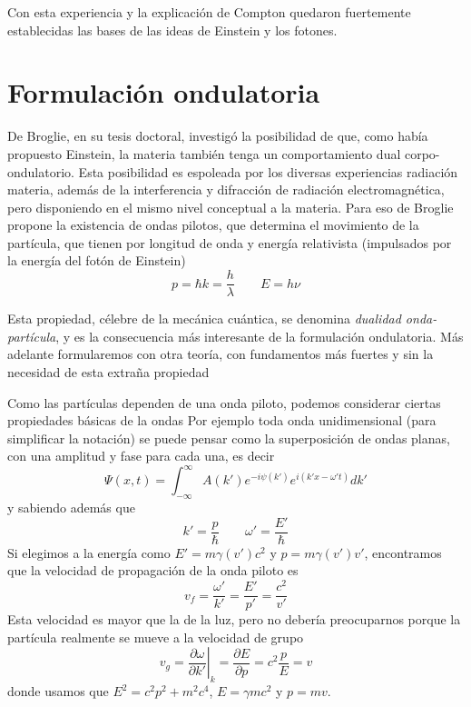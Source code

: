 Con esta experiencia y la explicación de Compton quedaron fuertemente establecidas las bases de las ideas de Einstein y los fotones.

\section{Formulación ondulatoria}

De Broglie, en su tesis doctoral, investigó la posibilidad de que, como había propuesto Einstein, la materia también tenga un comportamiento dual corpo-ondulatorio.
Esta posibilidad es espoleada por los diversas experiencias radiación materia, además de la interferencia y difracción de radiación electromagnética, pero disponiendo en el mismo nivel conceptual a la materia.
Para eso de Broglie propone la existencia de ondas pilotos, que determina el movimiento de la partícula, que tienen por longitud de onda y energía relativista (impulsados por la energía del fotón de Einstein)
\begin{equation}
    p = \hbar k = \frac{h}{\lambda} \qquad E = h\nu
\end{equation}

Esta propiedad, célebre de la mecánica cuántica, se denomina \emph{dualidad onda-partícula}, y es la consecuencia más interesante de la formulación ondulatoria.
Más adelante formularemos con otra teoría, con fundamentos más fuertes y sin la necesidad de esta extraña propiedad

Como las partículas dependen de una onda piloto, podemos considerar ciertas propiedades básicas de la ondas
Por ejemplo toda onda unidimensional (para simplificar la notación) se puede pensar como la superposición de ondas planas, con una amplitud y fase para cada una, es decir
\begin{equation}
    \Psi(x,t) = \int_{-\infty}^{\infty} A(k') e^{-i\psi(k')} e^{i (k' x - \omega' t)} dk'
\end{equation}
y sabiendo además que
\[ k' = \frac{p}{\hbar} \qquad \omega' = \frac{E'}{\hbar}\]
Si elegimos a la energía como $E' = m \gamma(v') c^2$ y $p = m \gamma(v') v'$, encontramos que la velocidad de propagación de la onda piloto es
\begin{equation}
    v_f = \frac{\omega'}{k'} = \frac{E'}{p'} = \frac{c^2}{v'}
\end{equation}
Esta velocidad es mayor que la de la luz, pero no debería preocuparnos porque la partícula realmente se mueve a la velocidad de grupo
\begin{equation}
    v_g = \left.\frac{\partial \omega}{\partial k'}\right|_k = \frac{\partial E}{\partial p} = c^2 \frac{p}{E} = v
\end{equation}
donde usamos que $E^2 = c^2 p^2 + m^2 c^4$, $E = \gamma m c^2$ y $p = m v$.

